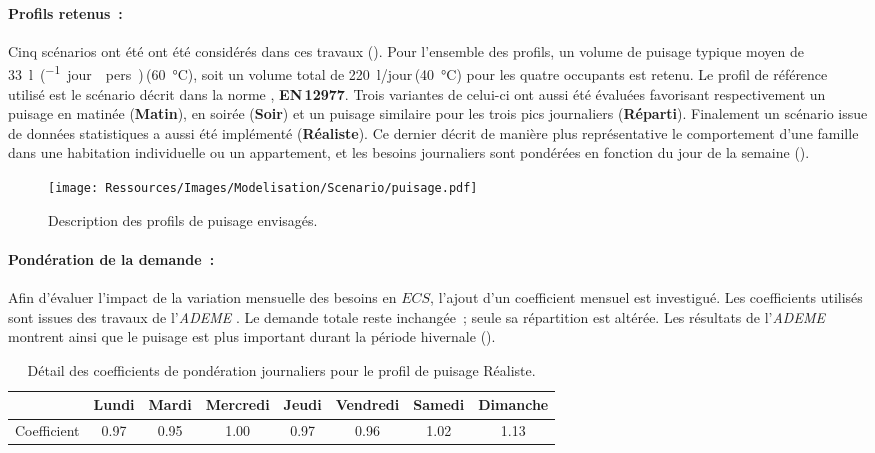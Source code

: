 \paragraph{Profils retenus~:} %
\label{par:profils_retenus}
Cinq scénarios ont été ont été considérés dans ces travaux ().
Pour l’ensemble des profils, un volume de puisage typique moyen de
\SI{33}{\litre\per(jour\period pers)}\,(\SI{60}{\celsius}), soit un
volume total de \SI{220}{\litre/jour}\,(\SI{40}{\celsius}) pour les quatre occupants est
retenu. Le profil de référence utilisé est le scénario décrit dans la norme
\textcite{EN129771}, \textbf{EN\,12977}. Trois variantes de celui-ci ont aussi été évaluées favorisant
respectivement un puisage en matinée (\textbf{Matin}), en soirée (\textbf{Soir}) et un
puisage similaire pour les trois pics journaliers (\textbf{Réparti}). Finalement un scénario
issue de données statistiques \parencite{ADEME2016} a aussi été implémenté
(\textbf{Réaliste}). Ce dernier décrit de manière plus représentative le comportement
d’une famille dans une habitation individuelle ou un appartement, et les besoins
journaliers sont pondérées en fonction du jour de la semaine ().
\begin{figure}
    \centering
    \texttt{[image: Ressources/Images/Modelisation/Scenario/puisage.pdf]}
    \caption{Description des profils de puisage envisagés.}
    \label{fig:profil_puisage}
\end{figure}

\paragraph{Pondération de la demande~:} %
\label{par:ponderation_de_la_demande}
Afin d’évaluer l’impact de la variation mensuelle des besoins en $ECS$, l’ajout d’un
coefficient mensuel est investigué. Les coefficients utilisés sont issues des travaux de
l’\textit{ADEME} \parencite{ADEME2016}. Le demande totale reste inchangée~; seule sa
répartition est altérée. Les résultats de l’\textit{ADEME} montrent ainsi que le puisage est plus
important durant la période hivernale ().

\begin{table}
\centering
\caption{Détail des coefficients de pondération journaliers pour le profil de
         puisage Réaliste.}
\label{tab:coef_semaine}
\begin{tabular}{l*{7}{c}}
    \toprule
                & Lundi & Mardi & Mercredi & Jeudi & Vendredi & Samedi & Dimanche \\
    \midrule
    Coefficient & \num{0.97}  & \num{0.95}  & \num{1.00}     & \num{0.97}  & \num{0.96}     & \num{1.02}   & \num{1.13}     \\
    \bottomrule
\end{tabular}
\end{table}

